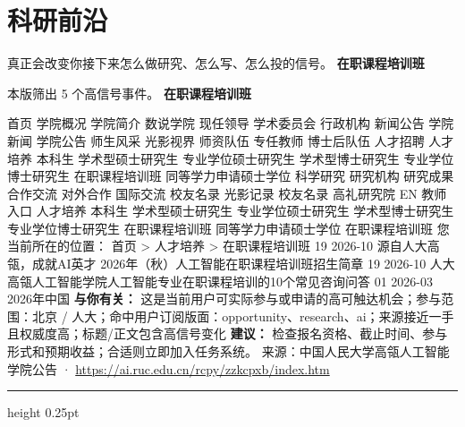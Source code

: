\documentclass[10.5pt]{ctexart}
\begin{document}
\section*{科研前沿}
{\color{ormuted} 真正会改变你接下来怎么做研究、怎么写、怎么投的信号。}
\vspace{2mm}
{\LARGE\bfseries 在职课程培训班}\par
\vspace{1mm}
{\color{ormuted} 本版筛出 5 个高信号事件。}
\vspace{3mm}
{\Large\bfseries 在职课程培训班}\par
首页 学院概况 学院简介 数说学院 现任领导 学术委员会 行政机构 新闻公告 学院新闻 学院公告 师生风采 光影视界 师资队伍 专任教师 博士后队伍 人才招聘 人才培养 本科生 学术型硕士研究生 专业学位硕士研究生 学术型博士研究生 专业学位博士研究生 在职课程培训班 同等学力申请硕士学位 科学研究 研究机构 研究成果 合作交流 对外合作 国际交流 校友名录 光影记录 校友名录 高礼研究院 EN 教师入口 人才培养 本科生 学术型硕士研究生 专业学位硕士研究生 学术型博士研究生 专业学位博士研究生 在职课程培训班 同等学力申请硕士学位 在职课程培训班 您当前所在的位置： 首页 > 人才培养 > 在职课程培训班 19 2026-10 源自人大高瓴，成就AI英才 2026年（秋）人工智能在职课程培训班招生简章 19 2026-10 人大高瓴人工智能学院人工智能专业在职课程培训的10个常见咨询问答 01 2026-03 2026年中国
\textbf{与你有关：} 这是当前用户可实际参与或申请的高可触达机会；参与范围：北京 / 人大；命中用户订阅版面：opportunity、research、ai；来源接近一手且权威度高；标题/正文包含高信号变化
\textbf{建议：} 检查报名资格、截止时间、参与形式和预期收益；合适则立即加入任务系统。
{\footnotesize\color{ormuted} 来源：中国人民大学高瓴人工智能学院公告 · \url{https://ai.ruc.edu.cn/rcpy/zzkcpxb/index.htm}}
\vspace{4mm}
\hrule height 0.25pt
\vspace{3mm}
\end{document}
